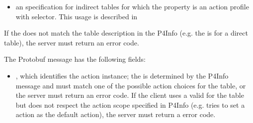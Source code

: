 \documentclass[11pt]{article}
\begin{document}
{\begin{itemize}
\item{}
an  specification for indirect tables for
which the  property is an action profile with
selector. This usage is described in~%
\end{itemize}%

\noindent{}If the  does not match the table description in the P4Info (e.g. the
 is  for a direct table), the server must
return an  error code.%

The  Protobuf message has the following fields:%

\begin{itemize}%

\item{}
, which identifies the action instance; the  is
determined by the P4Info message and must match one of the possible action
choices for the table, or the server must return an  error
code. If the client uses a valid  for the table but does not
respect the action scope specified in P4Info (e.g. tries to set a 
action as the default action), the server must return a 
error code.%


\end{itemize}}
\end{document}

